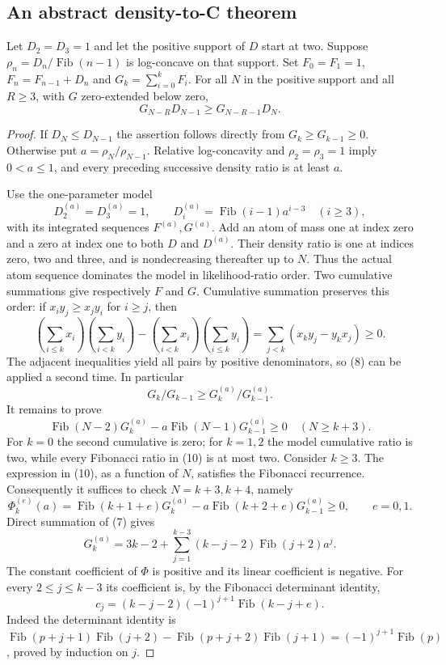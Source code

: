 \subsection*{An abstract density-to-C theorem}
\begin{theorem}
Let $D_2=D_3=1$ and let the positive support of $D$ start at two.
Suppose $\rho_n=D_n/\operatorname{Fib}(n-1)$ is log-concave on
that support.  Set $F_0=F_1=1$, $F_n=F_{n-1}+D_n$ and
$G_k=\sum_{i=0}^kF_i$.  For all $N$ in the positive support and
all $R\ge3$, with $G$ zero-extended below zero,
\[
                    G_{N-R}D_{N-1}\ge G_{N-R-1}D_N.       \tag{6}
\]
\end{theorem}
\begin{proof}
If $D_N\le D_{N-1}$ the assertion follows directly from
$G_k\ge G_{k-1}\ge0$.  Otherwise put
$a=\rho_N/\rho_{N-1}$.  Relative log-concavity and
$\rho_2=\rho_3=1$ imply $0<a\le1$, and every preceding
successive density ratio is at least $a$.

Use the one-parameter model
\[
 D^{(a)}_2=D^{(a)}_3=1,\qquad
 D^{(a)}_i=\operatorname{Fib}(i-1)a^{i-3}\quad(i\ge3),     \tag{7}
\]
with its integrated sequences $F^{(a)},G^{(a)}$.  Add an atom
of mass one at index zero and a zero at index one to both $D$
and $D^{(a)}$.  Their density ratio is one at indices zero,
two and three, and is nondecreasing thereafter up to $N$.
Thus the actual atom sequence dominates the model in likelihood-ratio
order.  Two cumulative summations give respectively $F$ and $G$.
Cumulative summation preserves this order: if $x_i y_j\ge x_jy_i$
for $i\ge j$, then
\[
 (\sum_{i\le k}x_i)(\sum_{i<k}y_i)
 -(\sum_{i<k}x_i)(\sum_{i\le k}y_i)
       =\sum_{j<k}(x_ky_j-y_kx_j)\ge0.                 \tag{8}
\]
The adjacent inequalities yield all pairs by positive denominators,
so (8) can be applied a second time.  In particular
\[
             G_k/G_{k-1}\ge G^{(a)}_k/G^{(a)}_{k-1}.      \tag{9}
\]
It remains to prove
\[
 \operatorname{Fib}(N-2)G^{(a)}_k
  -a\operatorname{Fib}(N-1)G^{(a)}_{k-1}\ge0
                       \quad(N\ge k+3).                 \tag{10}
\]
For $k=0$ the second cumulative is zero; for $k=1,2$ the
model cumulative ratio is two, while every Fibonacci ratio
in (10) is at most two.  Consider $k\ge3$.  The expression in
(10), as a function of $N$, satisfies the Fibonacci recurrence.
Consequently it suffices to check $N=k+3,k+4$, namely
\[
 \Phi^{(e)}_k(a)=\operatorname{Fib}(k+1+e)G^{(a)}_k
       -a\operatorname{Fib}(k+2+e)G^{(a)}_{k-1}\ge0,
                         \qquad e=0,1.                  \tag{11}
\]
Direct summation of (7) gives
\[
 G^{(a)}_k=3k-2+
  \sum_{j=1}^{k-3}(k-j-2)\operatorname{Fib}(j+2)a^j.
\]
The constant coefficient of $\Phi$ is positive and its linear
coefficient is negative.  For every $2\le j\le k-3$ its coefficient
is, by the Fibonacci determinant identity,
\[
 c_j=(k-j-2)(-1)^{j+1}\operatorname{Fib}(k-j+e).           \tag{12}
\]
Indeed the determinant identity is
$\operatorname{Fib}(p+j+1)\operatorname{Fib}(j+2)
 -\operatorname{Fib}(p+j+2)\operatorname{Fib}(j+1)
 =(-1)^{j+1}\operatorname{Fib}(p)$, proved by induction on $j$.


\end{proof}
